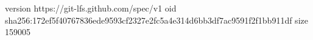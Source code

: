 version https://git-lfs.github.com/spec/v1
oid sha256:172ef5f40767836ede9593cf2327e2fc5a4e314d6bb3df7ac9591f2f1bb911df
size 159005
